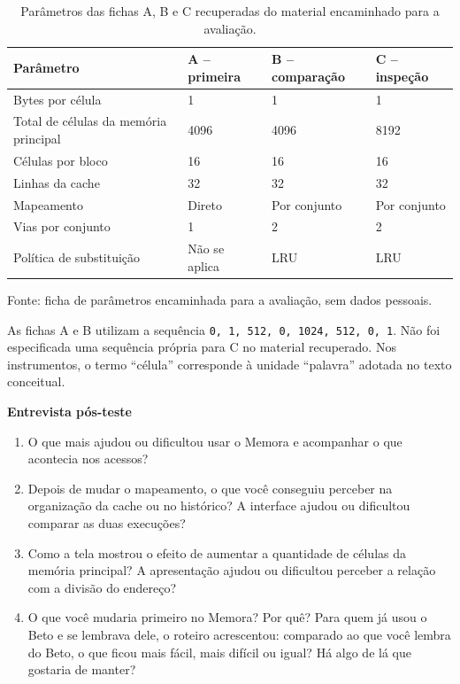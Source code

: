 \begin{table}[!htbp]
\centering
\caption{Parâmetros das fichas A, B e C recuperadas do material encaminhado para a avaliação.}
\label{tab:fichas-abc}
\small
\begin{tabular}{@{}P{5.0cm}P{2.7cm}P{2.7cm}P{2.7cm}@{}}
\toprule
\textbf{Parâmetro} & \textbf{A -- primeira} & \textbf{B -- comparação} & \textbf{C -- inspeção} \\
\midrule
Bytes por célula & 1 & 1 & 1 \\
Total de células da memória principal & 4096 & 4096 & 8192 \\
Células por bloco & 16 & 16 & 16 \\
Linhas da cache & 32 & 32 & 32 \\
Mapeamento & Direto & Por conjunto & Por conjunto \\
Vias por conjunto & 1 & 2 & 2 \\
Política de substituição & Não se aplica & LRU & LRU \\
\bottomrule
\end{tabular}
\par\footnotesize Fonte: ficha de parâmetros encaminhada para a avaliação, sem dados pessoais.
\end{table}

As fichas A e B utilizam a sequência \texttt{0, 1, 512, 0, 1024, 512, 0, 1}. Não foi especificada uma sequência própria para C no material recuperado. Nos instrumentos, o termo ``célula'' corresponde à unidade ``palavra'' adotada no texto conceitual.

\textbf{Entrevista pós-teste}
\begin{enumerate}
\item O que mais ajudou ou dificultou usar o Memora e acompanhar o que acontecia nos acessos?
\item Depois de mudar o mapeamento, o que você conseguiu perceber na organização da cache ou no histórico? A interface ajudou ou dificultou comparar as duas execuções?
\item Como a tela mostrou o efeito de aumentar a quantidade de células da memória principal? A apresentação ajudou ou dificultou perceber a relação com a divisão do endereço?
\item O que você mudaria primeiro no Memora? Por quê? Para quem já usou o Beto e se lembrava dele, o roteiro acrescentou: comparado ao que você lembra do Beto, o que ficou mais fácil, mais difícil ou igual? Há algo de lá que gostaria de manter?
\end{enumerate}

